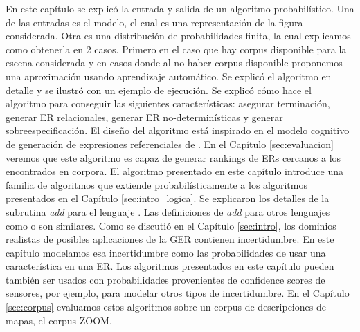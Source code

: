En este cap\'itulo se explic\'o la entrada y salida de un algoritmo probabil\'istico. Una de las entradas es el modelo, el cual es una representaci\'on de la figura considerada. Otra es una distribuci\'on de probabilidades finita, la cual explicamos como obtenerla en 2 casos. Primero en el caso que hay corpus disponible para la escena considerada y en casos donde al no haber corpus disponible proponemos una aproximaci\'on usando aprendizaje autom\'atico. Se explic\'o el algoritmo en detalle y se ilustr\'o con un ejemplo de ejecuci\'on. Se explic\'o c\'omo hace el algoritmo para conseguir las siguientes caracter\'isticas: asegurar terminaci\'on, generar ER relacionales, generar ER no-determin\'isticas y generar sobreespecificaci\'on.
El dise\~no del algoritmo est\'a inspirado en el modelo cognitivo de generaci\'on de expresiones referenciales de \cite{keysar:Curr98}. En el Cap\'itulo \ref{sec:evaluacion} veremos que este algoritmo es capaz de generar rankings de ERs cercanos a los encontrados en corpora.
El algoritmo presentado en este cap\'itulo introduce una familia de algoritmos que extiende probabil\'isticamente a los algoritmos presentados en el Cap\'itulo \ref{sec:intro_logica}. Se explicaron los detalles de la subrutina \textit{add} para el lenguaje \EL. Las definiciones de \textit{add} para otros lenguajes como \ALC o \EPFOL son similares.
Como se discuti\'o en el Cap\'itulo \ref{sec:intro}, los dominios realistas de posibles aplicaciones de la GER contienen incertidumbre. En este cap\'itulo modelamos esa incertidumbre como las probabilidades de usar una caracter\'istica en una ER. 
Los algoritmos presentados en este cap\'itulo pueden tambi\'en ser usados con probabilidades provenientes de confidence scores de sensores, por ejemplo, para modelar otros tipos de incertidumbre.
En el Cap\'itulo \ref{sec:corpus} evaluamos estos algoritmos sobre un corpus de descripciones de mapas, el corpus ZOOM.
%
